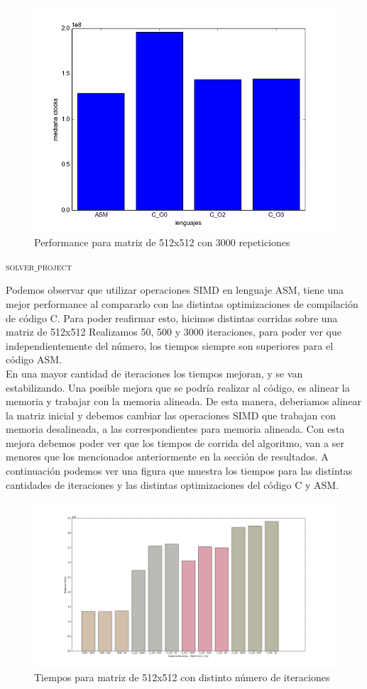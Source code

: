\begin{figure}[h]
  \centering
    \includegraphics[width=.6\linewidth]{Matriz_512_3000.png}
    \caption{Performance para matriz de 512x512 con 3000 repeticiones}
    \label{fig:M3000it}
\end{figure}

\newpage

{\scshape\Large solver$\_$project\par}

Podemos observar que utilizar operaciones SIMD en lenguaje ASM, tiene una mejor performance al compararlo con las distintas optimizaciones de compilaci\'on de c\'odigo C.
Para poder reafirmar esto, hicimos distintas corridas sobre una matriz de 512x512 
Realizamos 50, 500 y 3000 iteraciones, para poder ver que independientemente del n\'umero, los tiempos siempre son superiores para el c\'odigo ASM.\\
En una mayor cantidad de iteraciones los tiempos mejoran, y se van estabilizando.
Una posible mejora que se podr\'ia realizar al c\'odigo, es alinear la memoria y trabajar con la memoria alineada.\newline
De esta manera, deberiamos alinear la matriz inicial y debemos cambiar las operaciones SIMD que trabajan con memoria desalineada, a las correspondientes para memoria alineada.
Con esta mejora debemos poder ver que los tiempos de corrida del algoritmo, van a ser menores que los mencionados anteriormente en la secci\'on de resultados.
A continuaci\'on podemos ver una figura que muestra los tiempos para las distintas cantidades de iteraciones y las distintas optimizaciones del c\'odigo C y ASM.
\begin{figure}[h]
  \centering
    \includegraphics[width=.6\linewidth]{512x512_results.png}
    \caption{Tiempos para matriz de 512x512 con distinto n\'umero de iteraciones}
\end{figure}



